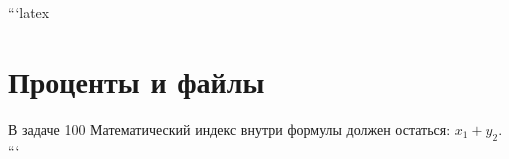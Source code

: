 ```latex
\section{Проценты и файлы}
В задаче 100%
Математический индекс внутри формулы должен остаться: $x_1 + y_2$.
```
